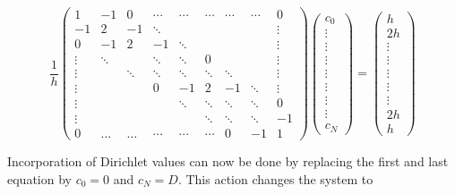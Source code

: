 \documentclass[../main.tex]{subfiles}
\begin{document}
		\begin{equation}
			\label{eqa183}
			\frac{1}{h}\left(\begin{array}{ccccccccc}
				1 & -1 & 0 & \cdots & \cdots & \cdots & \cdots & \cdots & 0 \\
				-1 & 2 & -1 & \ddots & & & & & \vdots \\
				0 & -1 & 2 & -1 & \ddots & & & & \vdots \\
				\vdots & \ddots & & \ddots & \ddots & 0 & & & \vdots \\
				\vdots & & \ddots & \ddots & \ddots & \ddots & \ddots & & \vdots \\
				\vdots & & & 0 & -1 & 2 & -1 & \ddots & \vdots \\
				\vdots & & & & \ddots & \ddots & \ddots & \ddots & 0 \\
				\vdots & & & & & \ddots & \ddots & \ddots & -1 \\
				0 & \ldots & \ldots & \cdots & \cdots & \cdots & 0 & -1 & 1
			\end{array}\right)\left(\begin{array}{c}
				c_{0} \\
				\vdots \\
				\vdots \\
				\vdots \\
				\vdots \\
				\vdots \\
				\vdots \\
				\vdots \\
				c_{N}
			\end{array}\right)=\left(\begin{array}{c}
				h \\
				2 h \\
				\vdots \\
				\vdots \\
				\vdots \\
				\vdots \\
				\vdots \\
				2 h \\
				h
			\end{array}\right)
		\end{equation}
	
		Incorporation of Dirichlet values can now be done by replacing the first and last equation by $c_{0}=0$ and $c_{N}=D$. This action changes the system to
		
\end{document}
